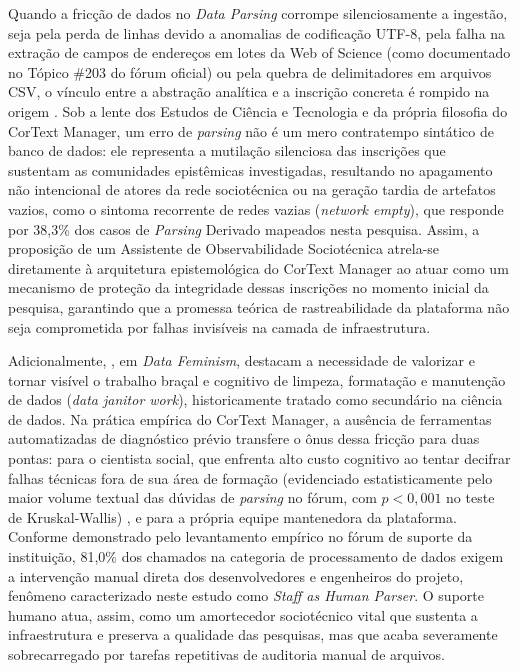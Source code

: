 \documentclass[
	oneside,
	a4paper,
	12pt,
	chapter=TITLE,
	section=TITLE,
	english,
	brazilian
]{abntex2}
\begin{document}
Quando a fricção de dados no \textit{Data Parsing} corrompe silenciosamente a ingestão, seja pela perda de linhas devido a anomalias de codificação UTF-8, pela falha na extração de campos de endereços em lotes da Web of Science (como documentado no Tópico \#203 do fórum oficial) ou pela quebra de delimitadores em arquivos CSV, o vínculo entre a abstração analítica e a inscrição concreta é rompido na origem \cite{CorText2026}. Sob a lente dos Estudos de Ciência e Tecnologia e da própria filosofia do CorText Manager, um erro de \textit{parsing} não é um mero contratempo sintático de banco de dados: ele representa a mutilação silenciosa das inscrições que sustentam as comunidades epistêmicas investigadas, resultando no apagamento não intencional de atores da rede sociotécnica ou na geração tardia de artefatos vazios, como o sintoma recorrente de redes vazias (\textit{network empty}), que responde por 38,3\% dos casos de \textit{Parsing} Derivado mapeados nesta pesquisa. Assim, a proposição de um Assistente de Observabilidade Sociotécnica atrela-se diretamente à arquitetura epistemológica do CorText Manager ao atuar como um mecanismo de proteção da integridade dessas inscrições no momento inicial da pesquisa, garantindo que a promessa teórica de rastreabilidade da plataforma não seja comprometida por falhas invisíveis na camada de infraestrutura.

Adicionalmente, , em \textit{Data Feminism}, destacam a necessidade de valorizar e tornar visível o trabalho braçal e cognitivo de limpeza, formatação e manutenção de dados (\textit{data janitor work}), historicamente tratado como secundário na ciência de dados. Na prática empírica do CorText Manager, a ausência de ferramentas automatizadas de diagnóstico prévio transfere o ônus dessa fricção para duas pontas: para o cientista social, que enfrenta alto custo cognitivo ao tentar decifrar falhas técnicas fora de sua área de formação (evidenciado estatisticamente pelo maior volume textual das dúvidas de \textit{parsing} no fórum, com $p < 0,001$ no teste de Kruskal-Wallis) \cite{Kruskal1952}, e para a própria equipe mantenedora da plataforma. Conforme demonstrado pelo levantamento empírico no fórum de suporte da instituição, 81,0\% dos chamados na categoria de processamento de dados exigem a intervenção manual direta dos desenvolvedores e engenheiros do projeto, fenômeno caracterizado neste estudo como \textit{Staff as Human Parser}. O suporte humano atua, assim, como um amortecedor sociotécnico vital que sustenta a infraestrutura e preserva a qualidade das pesquisas, mas que acaba severamente sobrecarregado por tarefas repetitivas de auditoria manual de arquivos.
\end{document}
